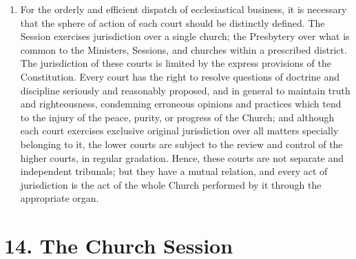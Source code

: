 \documentclass[
]{book}
\begin{document}
\begin{enumerate}
\item
  For the orderly and efficient dispatch of ecclesiastical business, it is necessary that the sphere of action of each court should be distinctly defined. The Session exercises jurisdiction over a single church; the Presbytery over what is common to the Ministers, Sessions, and churches within a prescribed district. The jurisdiction of these courts is limited by the express provisions of the Constitution. Every court has the right to resolve questions of doctrine and discipline seriously and reasonably proposed, and in general to maintain truth and righteousness, condemning erroneous opinions and practices which tend to the injury of the peace, purity, or progress of the Church; and although each court exercises exclusive original jurisdiction over all matters specially belonging to it, the lower courts are subject to the review and control of the higher courts, in regular gradation. Hence, these courts are not separate and independent tribunals; but they have a mutual relation, and every act of jurisdiction is the act of the whole Church performed by it through the appropriate organ.
\end{enumerate}

\hypertarget{the-church-session}{%
\section*{14. The Church Session}\label{the-church-session}}

\protect\hypertarget{chapter-slug-14-the-church-session}{\href{}{}}
\end{document}
